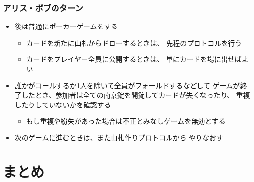 
\begin{frame}
  \frametitle{\showIndex アリス・ボブのターン}

  \begin{itemize}
    \item<+-> 後は普通にポーカーゲームをする
    \begin{itemize}
      \item カードを新たに山札からドローするときは、
      先程のプロトコルを行う
      \item カードをプレイヤー全員に公開するときは、
      単にカードを場に出せばよい
    \end{itemize}

    \item<+-> 誰かがコールするか1人を除いて全員がフォールドするなどして
    ゲームが終了したとき、参加者は全ての南京錠を開錠してカードが失くなったり、
    重複したりしていないかを確認する
    \begin{itemize}
      \item<+-> もし重複や紛失があった場合は不正とみなしゲームを無効とする
    \end{itemize}

    \item<+-> 次のゲームに進むときは、また山札作りプロトコルから
    やりなおす
  \end{itemize}
\end{frame}

\section{まとめ}


